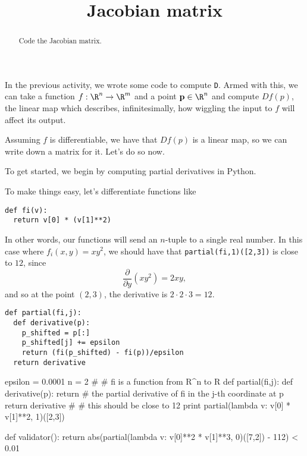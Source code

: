 \documentclass{ximera}
\title{Jacobian matrix}
\begin{document}
\begin{abstract}
  Code the Jacobian matrix.
\end{abstract}\maketitle

In the previous activity, we wrote some code to compute \texttt{D}.
Armed with this, we can take a function $f : \R^n \to \R^m$ and a
point $\mathbf{p} \in \R^n$ and compute $Df(p)$, the linear map which
describes, infinitesimally, how wiggling the input to $f$ will affect
its output.

Assuming $f$ is differentiable, we have that $Df(p)$ is a linear map,
so we can write down a matrix for it.  Let's do so now.

\begin{exercise}
To get started, we begin by computing partial derivatives in Python.

To make things easy, let's differentiate functions like 
\begin{verbatim}
def fi(v):
  return v[0] * (v[1]**2)
\end{verbatim}
In other words, our functions will send an $n$-tuple to a single real number.
In this case where $f_i(x,y) = xy^2$, we should have that \texttt{partial(fi,1)([2,3])} is close to $12$, since
$$
\frac{\partial}{\partial y} \left( x y^2 \right) = 2 xy,
$$
and so at the point $(2,3)$, the derivative is $2 \cdot 2 \cdot 3 = 12$.

\begin{solution}
  \begin{hint}
\begin{verbatim}
def partial(fi,j):
  def derivative(p):
    p_shifted = p[:]
    p_shifted[j] += epsilon
    return (fi(p_shifted) - fi(p))/epsilon
  return derivative
\end{verbatim}
  \end{hint}
  \begin{python}
epsilon = 0.0001
n = 2
#
# fi is a function from R^n to R
def partial(fi,j):
  def derivative(p):
    return # the partial derivative of fi in the j-th coordinate at p
  return derivative
#
# this should be close to 12
print partial(lambda v: v[0] * v[1]**2, 1)([2,3])

def validator():
  return abs(partial(lambda v: v[0]**2 * v[1]**3, 0)([7,2]) - 112) < 0.01
  \end{python}
\end{solution}


\end{exercise}
\end{document}
